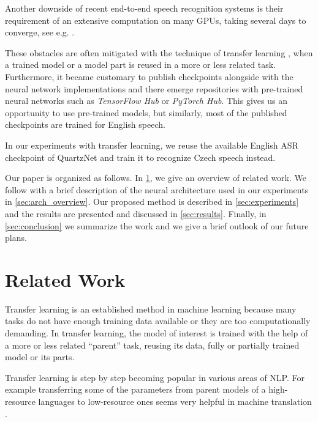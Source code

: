Another downside of recent end-to-end speech recognition systems is their requirement of an extensive computation on many GPUs, taking several days to converge, see e.g. . 

These obstacles 
are often mitigated with the technique of transfer learning , when a trained model or a model part is reused in a more or less related task.
Furthermore, it became customary to publish checkpoints alongside with the neural network implementations and 
there emerge repositories with pre-trained neural networks such as \textit{TensorFlow Hub} or \textit{PyTorch
Hub}. This gives us an opportunity to use pre-trained models, but similarly, most of the published checkpoints are trained for English speech.

In our experiments with transfer learning, 
we reuse the available English ASR checkpoint of QuartzNet  and train it to recognize Czech speech instead.


Our paper is organized as follows. In \cref{sec:related_work}, we give an overview of related work. We follow with a brief description of the neural architecture used in our experiments in \cref{sec:arch_overview}.
Our proposed method is described in \cref{sec:experiments} and the results are presented and discussed in \cref{sec:results}.
Finally, in \cref{sec:conclusion} we summarize the work and we give a brief outlook of our future plans.


\section{Related Work}
\label{sec:related_work}

Transfer learning  is an established method in machine learning because many tasks do not have enough training data available or they are too computationally demanding. In transfer learning, the model of interest is trained with the help of a more or less related ``parent'' task, reusing its data, fully or partially trained model or its parts.

Transfer learning is step by step becoming popular in various areas of NLP. 
For example transferring some of the parameters from parent models of a high-resource languages to low-resource ones seems very helpful in machine translation .

